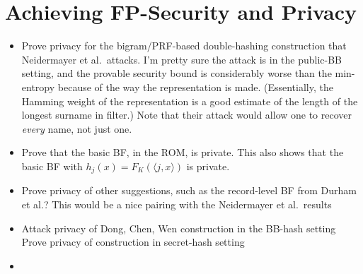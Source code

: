 \section{Achieving FP-Security and Privacy}
\begin{itemize}
\item Prove privacy for the bigram/PRF-based double-hashing construction that Neidermayer et al.\ attacks. I'm pretty sure the attack is in the public-BB setting, and the provable security bound is considerably worse than the min-entropy because of the way the representation is made.  (Essentially, the Hamming weight of the representation is a good estimate of the length of the longest surname in filter.)  Note that their attack would allow one to recover \emph{every} name, not just one.

\item Prove that the basic BF, in the ROM, is private.  This also shows that the basic BF with $h_j(x)=F_K(\langle j,x \rangle)$ is private.  

\item Prove privacy of other suggestions, such as the record-level BF from Durham et al.?  This would be a nice pairing with the Neidermayer et al.\ results

\item Attack privacy of Dong, Chen, Wen construction in the BB-hash setting   Prove privacy of construction in secret-hash setting

\item {}
\end{itemize}